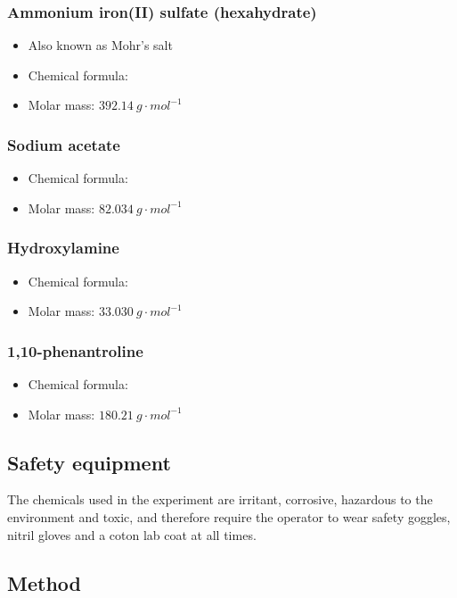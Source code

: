 \documentclass[twocolumn]{article}
\begin{document}
\subsubsection{Ammonium iron(II) sulfate (hexahydrate)}
\begin{itemize}
    \item Also known as Mohr's salt
    \item Chemical formula: 
    \item Molar mass: $392.14 \ g \cdot mol^{-1}$ \cite{marker1}
\end{itemize}
\subsubsection{Sodium acetate}
\begin{itemize}
    \item Chemical formula: 
    \item Molar mass: $82.034 \ g \cdot mol^{-1}$ \cite{marker2}
\end{itemize}
\subsubsection{Hydroxylamine}
\begin{itemize}
    \item Chemical formula: 
    \item Molar mass: $33.030 \ g \cdot mol^{-1}$ \cite{marker3}
\end{itemize}
\subsubsection{1,10-phenantroline}
\begin{itemize}
    \item Chemical formula: 
    \item Molar mass: $180.21 \ g \cdot mol^{-1}$ \cite{marker4}
\end{itemize}
\subsection{Safety equipment}
The chemicals used in the experiment are irritant, corrosive, hazardous to the environment and toxic, and therefore require the operator to wear safety goggles, nitril gloves and a coton lab coat at all times.
\subsection{Method}
\end{document}
